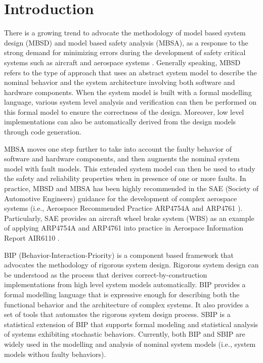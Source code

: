 
\section{Introduction}

There is a growing trend to advocate the methodology of model based system design (MBSD) and model based safety analysis (MBSA),
 as a response to the strong demand for minimizing errors during the development of safety critical systems such as aircraft and aerospace systems \cite{lctes10,issrew12}.
 Generally speaking,  MBSD refers to the type of approach 
 that uses an abstract system model to describe the nominal behavior and the system architecture involving both software and hardware components.
 When the system model is built with a formal modelling language, various system level analysis and verification can then be performed on this formal model to ensure the correctness of the design.
 Moreover, low level implementations can also be automatically derived from the design models through code generation.

MBSA moves one step further to take into account the faulty behavior of software and hardware components,
 and then augments the nominal system model with fault models.
 This extended system model can then be used to study the safety and reliability properties when in presence of one or more faults.
% 
 In practice, MBSD and MBSA has been highly recommended in the SAE (Society of Automotive Engineers) guidance for the development of complex aerospace systems 
  (i.e., Aerospace Recommended Practice ARP4754A \cite{arp4754a} and ARP4761 \cite{arp4761}).
  Particularly, SAE provides an aircraft wheel brake system (WBS) as an example of applying ARP4754A and ARP4761 into practice 
  in Aerospace Information Report AIR6110 \cite{air6110}.


BIP (Behavior-Interaction-Priority) \cite{bip1,bip2} is a component based framework that advocates the methodology of rigorous system design.
 Rigorous system design can be understood as the process that derives correct-by-construction implementations from high level system models automatically.
 BIP provides a formal modelling language that is expressive enough for describing both the functional behavior and the architecture of complex systems.
 It also provides a set of tools that automates the rigorous system design process.
 SBIP \cite{sbip18} is a statistical extension of BIP that supports formal modeling and statistical analysis of systems exhibiting stochastic behaviors.
 Currently, both BIP and SBIP are widely used in the modelling and analysis of nominal system models (i.e., system models withou faulty behaviors).

